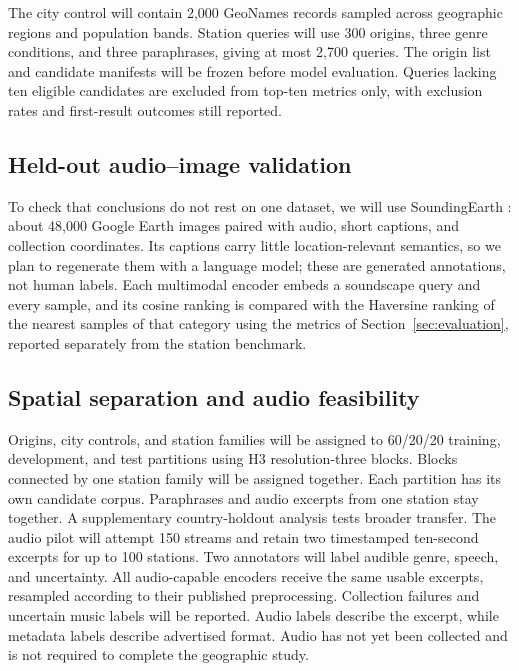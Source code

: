 \documentclass[10pt]{article}
\begin{document}
The city control will contain 2,000 GeoNames records sampled across geographic regions and population bands. Station queries will use 300 origins, three genre conditions, and three paraphrases, giving at most 2,700 queries. The origin list and candidate manifests will be frozen before model evaluation. Queries lacking ten eligible candidates are excluded from top-ten metrics only, with exclusion rates and first-result outcomes still reported.

\subsection{Held-out audio--image validation}
To check that conclusions do not rest on one dataset, we will use SoundingEarth \citep{heidler2023self}: about 48,000 Google Earth images paired with audio, short captions, and collection coordinates. Its captions carry little location-relevant semantics, so we plan to regenerate them with a language model; these are generated annotations, not human labels. Each multimodal encoder embeds a soundscape query and every sample, and its cosine ranking is compared with the Haversine ranking of the nearest samples of that category using the metrics of Section~\ref{sec:evaluation}, reported separately from the station benchmark.

\subsection{Spatial separation and audio feasibility}
Origins, city controls, and station families will be assigned to 60/20/20 training, development, and test partitions using H3 resolution-three blocks. Blocks connected by one station family will be assigned together. Each partition has its own candidate corpus. Paraphrases and audio excerpts from one station stay together. A supplementary country-holdout analysis tests broader transfer.
The audio pilot will attempt 150 streams and retain two timestamped ten-second excerpts for up to 100 stations. Two annotators will label audible genre, speech, and uncertainty. All audio-capable encoders receive the same usable excerpts, resampled according to their published preprocessing. Collection failures and uncertain music labels will be reported. Audio labels describe the excerpt, while metadata labels describe advertised format. Audio has not yet been collected and is not required to complete the geographic study.
\end{document}

